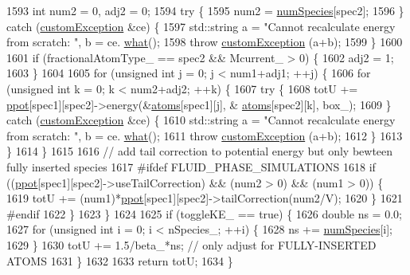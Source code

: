 \begin{DoxyCode}
1593             \textcolor{keywordtype}{int} num2 = 0, adj2 = 0;
1594             \textcolor{keywordflow}{try} \{
1595                 num2 = \hyperlink{classsim_system_a9eea865e6dc1cff377b1e79c4d9c23f0}{numSpecies}[spec2];
1596             \} \textcolor{keywordflow}{catch} (\hyperlink{classcustom_exception}{customException} &ce) \{
1597                 std::string a = \textcolor{stringliteral}{"Cannot recalculate energy from scratch: "}, b = ce.
      \hyperlink{classcustom_exception_aeb6ab5848b038adfc68fde86a512f691}{what}();
1598                 \textcolor{keywordflow}{throw} \hyperlink{classcustom_exception}{customException} (a+b);
1599             \}
1600 
1601             \textcolor{keywordflow}{if} (fractionalAtomType\_ == spec2 && Mcurrent\_ > 0) \{
1602                 adj2 = 1;
1603             \}
1604 
1605             \textcolor{keywordflow}{for} (\textcolor{keywordtype}{unsigned} \textcolor{keywordtype}{int} j = 0; j < num1+adj1; ++j) \{
1606                 \textcolor{keywordflow}{for} (\textcolor{keywordtype}{unsigned} \textcolor{keywordtype}{int} k = 0; k < num2+adj2; ++k) \{
1607                     \textcolor{keywordflow}{try} \{
1608                         totU += \hyperlink{classsim_system_ad2e290b5963f132e6a3a56cee35c8e9f}{ppot}[spec1][spec2]->energy(&\hyperlink{classsim_system_a90421b19082f7fb8fc23b7264b1161e4}{atoms}[spec1][j], &
      \hyperlink{classsim_system_a90421b19082f7fb8fc23b7264b1161e4}{atoms}[spec2][k], box\_);
1609                     \} \textcolor{keywordflow}{catch} (\hyperlink{classcustom_exception}{customException} &ce) \{
1610                         std::string a = \textcolor{stringliteral}{"Cannot recalculate energy from scratch: "}, b = ce.
      \hyperlink{classcustom_exception_aeb6ab5848b038adfc68fde86a512f691}{what}();
1611                         \textcolor{keywordflow}{throw} \hyperlink{classcustom_exception}{customException} (a+b);
1612                     \}
1613                 \}
1614             \}
1615 
1616             \textcolor{comment}{// add tail correction to potential energy but only bewteen fully inserted species}
1617 \textcolor{preprocessor}{#ifdef FLUID\_PHASE\_SIMULATIONS}
1618 \textcolor{preprocessor}{}            \textcolor{keywordflow}{if} ((\hyperlink{classsim_system_ad2e290b5963f132e6a3a56cee35c8e9f}{ppot}[spec1][spec2]->useTailCorrection) && (num2 > 0) && (num1 > 0)) \{
1619                 totU += (num1)*\hyperlink{classsim_system_ad2e290b5963f132e6a3a56cee35c8e9f}{ppot}[spec1][spec2]->tailCorrection(num2/V);
1620             \}
1621 \textcolor{preprocessor}{#endif}
1622 \textcolor{preprocessor}{}        \}
1623     \}
1624 
1625     \textcolor{keywordflow}{if} (toggleKE\_ == \textcolor{keyword}{true}) \{
1626         \textcolor{keywordtype}{double} ns = 0.0;
1627         \textcolor{keywordflow}{for} (\textcolor{keywordtype}{unsigned} \textcolor{keywordtype}{int} i = 0; i < nSpecies\_; ++i) \{
1628             ns += \hyperlink{classsim_system_a9eea865e6dc1cff377b1e79c4d9c23f0}{numSpecies}[i];
1629         \}
1630         totU += 1.5/beta\_*ns; \textcolor{comment}{// only adjust for FULLY-INSERTED ATOMS}
1631     \}
1632 
1633     \textcolor{keywordflow}{return} totU;
1634 \}
\end{DoxyCode}
